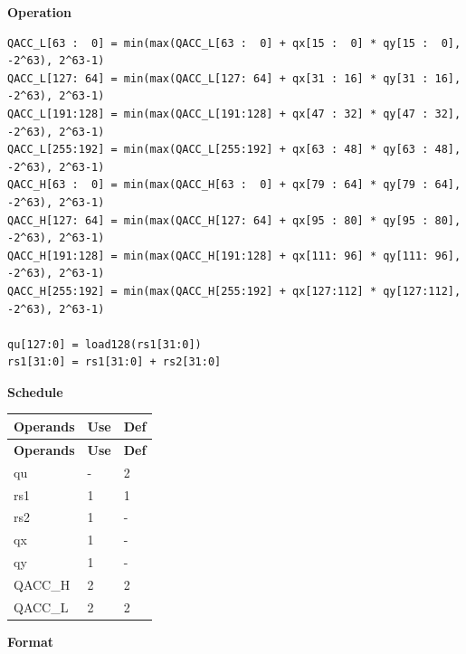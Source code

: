 \textbf{Operation}\\
\begin{lstlisting}
QACC_L[63 :  0] = min(max(QACC_L[63 :  0] + qx[15 :  0] * qy[15 :  0], -2^63), 2^63-1)
QACC_L[127: 64] = min(max(QACC_L[127: 64] + qx[31 : 16] * qy[31 : 16], -2^63), 2^63-1)
QACC_L[191:128] = min(max(QACC_L[191:128] + qx[47 : 32] * qy[47 : 32], -2^63), 2^63-1)
QACC_L[255:192] = min(max(QACC_L[255:192] + qx[63 : 48] * qy[63 : 48], -2^63), 2^63-1)
QACC_H[63 :  0] = min(max(QACC_H[63 :  0] + qx[79 : 64] * qy[79 : 64], -2^63), 2^63-1)
QACC_H[127: 64] = min(max(QACC_H[127: 64] + qx[95 : 80] * qy[95 : 80], -2^63), 2^63-1)
QACC_H[191:128] = min(max(QACC_H[191:128] + qx[111: 96] * qy[111: 96], -2^63), 2^63-1)
QACC_H[255:192] = min(max(QACC_H[255:192] + qx[127:112] * qy[127:112], -2^63), 2^63-1)

qu[127:0] = load128(rs1[31:0])
rs1[31:0] = rs1[31:0] + rs2[31:0]
\end{lstlisting}

\textbf{Schedule}\\
\begin{longtable}[c]{|l|l|l|}
    \hline
    \rowcolor{lightgray}
    \textbf{Operands} & \textbf{Use} & \textbf{Def} \\\hline
    \endfirsthead
    \hline
    \rowcolor{lightgray}
     \textbf{Operands} & \textbf{Use} & \textbf{Def} \\\hline
    \endhead
    \hline
    \endfoot

    qu & - & 2 \\\hline
    rs1 & 1 & 1 \\\hline
    rs2 & 1 & - \\\hline
     qx & 1 & - \\\hline
     qy & 1 & - \\\hline
     QACC\_H & 2 & 2 \\\hline
     QACC\_L & 2 & 2

\end{longtable}

\textbf{Format}\\

